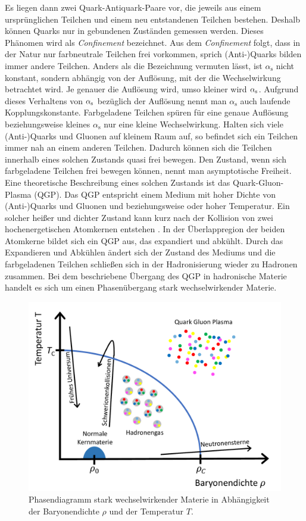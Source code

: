 Es liegen dann zwei Quark-Antiquark-Paare vor, die jeweils aus einem ursprünglichen Teilchen und einem neu entstandenen Teilchen bestehen.
Deshalb können Quarks nur in gebundenen Zuständen gemessen werden.
Dieses Phänomen wird als \textit{Confinement} bezeichnet.
Aus dem \textit{Confinement} folgt, dass in der Natur nur farbneutrale Teilchen frei vorkommen, sprich (Anti-)Quarks bilden immer andere Teilchen.%
\newline
Anders als die Bezeichnung vermuten lässt, ist $\alpha_\text{s}$ nicht konstant, sondern abhängig von der Auf\-lö\-sung, mit der die Wechselwirkung betrachtet wird.
Je genauer die Auflösung wird, umso kleiner wird $\alpha_{\rm{s}}$.
Aufgrund dieses Verhaltens von $\alpha_{\rm{s}}$ bezüglich der Auflösung nennt man $\alpha_\text{s}$ auch laufende Kopplungskonstante.
Farbgeladene Teilchen spüren für eine genaue Auflösung beziehungsweise kleines $\alpha_\text{s}$ nur eine kleine Wechselwirkung.
Halten sich viele (Anti-)Quarks und Gluonen auf kleinem Raum auf, so befindet sich ein Teilchen immer nah an einem anderen Teilchen.
Dadurch können sich die Teilchen innerhalb eines solchen Zustands quasi frei bewegen.
Den Zustand, wenn sich farbgeladene Teilchen frei bewegen können, nennt man asymptotische Freiheit.
\newline
Eine theoretische Beschreibung eines solchen Zustands ist das  Quark-Gluon-Plasma (QGP).
Das QGP entspricht einem Medium mit hoher Dichte von (Anti-)Quarks und Gluonen und beziehungsweise oder hoher Temperatur.
\newline
Ein solcher heißer und dichter Zustand kann kurz nach der Kollision von zwei hochenergetischen Atomkernen entstehen \cite{Karsch:2006xs}.
In der Überlappregion der beiden Atomkerne bildet sich ein QGP aus, das expandiert und abkühlt.
Durch das Expandieren und Abkühlen ändert sich der Zustand des Mediums und die farbgeladenen Teilchen schließen sich in der  Hadronisierung wieder zu Hadronen zusammen.
Bei dem beschriebene Übergang des QGP in hadronische Materie handelt es sich um einen Phasenübergang stark wechselwirkender Materie.
\begin{figure}[tp]
\centering
\includegraphics[width=.6\linewidth]{QCD_phase_diagram.pdf}
\caption{Phasendiagramm stark wechselwirkender Materie in Abhängigkeit der Baryonendichte $\rho$ und der Temperatur $T$.
\cite{Thesis:Tim}}
\label{fig:QGPPhase}
\end{figure}
